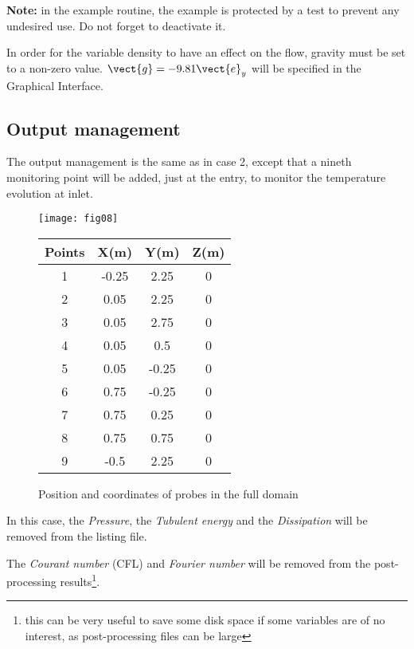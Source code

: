 \textbf{Note:} in the example routine, the example is protected by a test to prevent any
undesired use. Do not forget to deactivate it.

In order for the variable density to have an effect on the flow, gravity must be
set to a non-zero value. $\vect{g} = -9.81 \vect{e}_y$ will be specified in the
Graphical Interface.

        \subsection{Output management}

The output management is the same as in case 2, except that a nineth monitoring
point will be added, just at the entry, to monitor the temperature evolution at inlet.

\begin{figure}[htp]
\parbox{8cm}{%
\centerline{\texttt{[image: fig08]}}}
\parbox{7cm}{%
\begin{center}
\begin{tabular}{|c|c|c|c|}
\hline
Points & X(m) & Y(m) & Z(m)\\
\hline
1 & -0.25 & 2.25 & 0 \\
\hline
2 & 0.05 & 2.25 & 0 \\
\hline
3 & 0.05 & 2.75 & 0 \\
\hline
4 & 0.05 & 0.5 & 0 \\
\hline
5 & 0.05 & -0.25 & 0 \\
\hline
6 & 0.75 & -0.25 & 0 \\
\hline
7 & 0.75 & 0.25 & 0 \\
\hline
8 & 0.75 & 0.75 & 0 \\
\hline
9 & -0.5 & 2.25 & 0 \\
\hline
\end{tabular}
\end{center}
}
\caption{Position and coordinates of probes in the full domain}
\label{figante32}
\end{figure}

In this case, the {\itshape Pressure}, the {\itshape Tubulent energy} and the
{\itshape Dissipation} will be removed from the listing file.

The {\itshape Courant number} (CFL) and {\itshape Fourier number} will be
removed from the
post-processing results\footnote{this can be very useful to save some disk space
if some variables are of no interest, as post-processing files can be large}.

